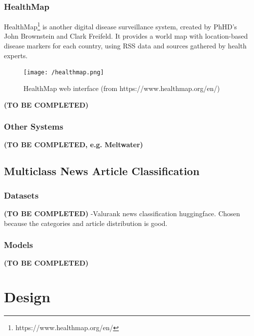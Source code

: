 \documentclass{l4proj}
\begin{document}
\subsection{HealthMap}
HealthMap\footnote{https://www.healthmap.org/en/} is another digital disease surveillance system, created by PhHD's John Brownstein and Clark Freifeld. It provides a world map with location-based disease markers for each country, using RSS data and sources gathered by health experts. \par
\begin{figure}[h]
\texttt{[image: /healthmap.png]}
\caption{HealthMap web interface (from https://www.healthmap.org/en/)}
\label{fig:healthmap_visualisation}
\end{figure}
\textbf{(TO BE COMPLETED)}


\subsection{Other Systems}
\textbf{(TO BE COMPLETED, e.g. Meltwater)}


\section{Multiclass News Article Classification}
\subsection{Datasets}
\textbf{(TO BE COMPLETED)}
-Valurank news classification huggingface. Chosen because the categories and article distribution is good.
\subsection{Models}
\textbf{(TO BE COMPLETED)}




\chapter{Design}
\end{document}
